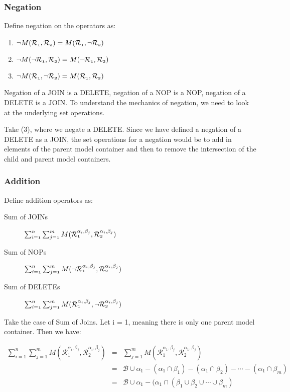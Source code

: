 \documentclass[12pt]{amsart}
\begin{document}
\subsubsection{Negation}
Define negation on the operators as:
\begin{enumerate}
\item $\mathnormal{\neg M(\mathcal{R}_{1},\mathcal{R}_{2} ) =M(\mathcal{R}_{1},\neg \mathcal{R}_{2} ) }$
\item $\mathnormal{\neg M(\neg \mathcal{R}_{1},\mathcal{R}_{2} ) =M(\neg \mathcal{R}_{1}, \mathcal{R}_{2} ) }$
\item $\mathnormal{\neg M(\mathcal{R}_{1}, \neg \mathcal{R}_{2}) =  M(\mathcal{R}_{1},\mathcal{R}_{2} )} $ 
\end{enumerate}
Negation of a JOIN is a DELETE, negation of a NOP is a NOP, negation of a DELETE is a JOIN. To understand the mechanics of negation, we need to look at the underlying set operations. 

Take (3), where we negate a DELETE. Since we have defined a negation of a DELETE as a JOIN, the set operations for a negation would be to add in elements of the parent model container and then to remove the intersection of the child and parent model containers.
\subsubsection{Addition}
Define addition operators as:
\begin{description}
\item[Sum of JOINs] $\mathnormal{\sum_{i=1}^n \sum_{j=1}^m M(\mathcal{R}^{\alpha_{i} , \beta_{j}}_{1},\mathcal{R}^{\alpha_{i} , \beta_{j}}_{2} ) }$
\item[Sum of NOPs] $\mathnormal{\sum_{i=1}^n \sum_{j=1}^m M(\neg \mathcal{R}^{\alpha_{i} , \beta_{j}}_{1},\mathcal{R}^{\alpha_{i} , \beta_{j}}_{2} ) }$
\item[Sum  of DELETEs] $\mathnormal{\sum_{i=1}^n \sum_{j=1}^m M(\mathcal{R}^{\alpha_{i} , \beta_{j}}_{1},\neg \mathcal{R}^{\alpha_{i} , \beta_{j}}_{2} ) }$
\end{description}

Take the case of Sum of Joins. Let i = 1, meaning there is only one parent model container. Then we have:

\begin{eqnarray}
\sum_{i=1}^n \sum_{j=1}^m M(\mathcal{R}^{\alpha_{i} , \beta_{j}}_{1},\mathcal{R}^{\alpha_{i} , \beta_{j}}_{2} )  & = &
\sum_{j=1}^m M(\mathcal{R}^{\alpha_{1} , \beta_{j}}_{1},\mathcal{R}^{\alpha_{1} , \beta_{j}}_{2} ) \\
& = &
\mathcal{B} \cup \alpha_{1}-(\alpha_{1} \cap \beta_{1}) - (\alpha_{1} \cap \beta_{2})  - \cdots - (\alpha_{1} \cap \beta_{m})  \\ & = &
\mathcal{B} \cup \alpha_{1}-(\alpha_{1} \cap (\beta_{1} \cup \beta_{2}  \cup \cdots  \cup \beta_{m})
\end{eqnarray}
\end{document}
